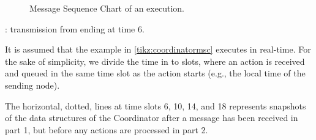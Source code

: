 \begin{figure}

\caption{Message Sequence Chart of an execution.}\label{tikz:coordinatormsc}
\end{figure}

: transmission from  ending at time 6. \medbreak

It is assumed that the example in \autoref{tikz:coordinatormsc} executes in real-time. For the sake of simplicity, we divide the time in to slots, where an action is received and queued in the same time slot as the action starts (e.g., the local time of the sending node). \smallbreak

The horizontal, dotted, lines at time slots 6, 10, 14, and 18 represents snapshots of the data structures of the Coordinator after a message has been received in part 1, but before any actions are processed in part 2.




